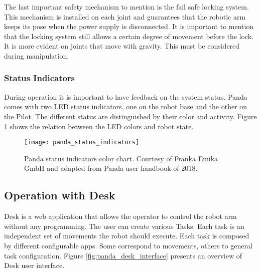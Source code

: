 The last important safety mechanism to mention is the fail safe locking system. This mechanism is installed on each joint and guarantees that the robotic arm keeps its pose when the power supply is disconnected. It is important to mention that the locking system still allows a certain degree of movement before the lock. It is more evident on joints that move with gravity. This must be considered during manipulation.


\subsubsection*{Status Indicators}
\label{subsec:robotic_system_operation_safety_status_indicators}

During operation it is important to have feedback on the system status. Panda comes with two LED status indicators, one on the robot base and the other on the Pilot. The different status are distinguished by their color and activity. Figure \ref{fig:panda_status_indicators} shows the relation between the LED colors and robot state.

\begin{figure}[htbp]
    \centering
	\texttt{[image: panda\_status\_indicators]}
	\caption[Panda status indicators color chart.]{Panda status indicators color chart. Courtesy of Franka Emika GmbH and adapted from Panda user handbook of 2018.}
	\label{fig:panda_status_indicators}
\end{figure}



\subsection{Operation with Desk}
\label{subsec:robotic_system_operation_desk}

Desk is a web application that allows the operator to control the robot arm without any programming. The user can create various Tasks. Each task is an independent set of movements the robot should execute. Each task is composed by different configurable apps. Some correspond to movements, others to general task configuration. Figure \ref{fig:panda_desk_interface} presents an overview of Desk user interface.

